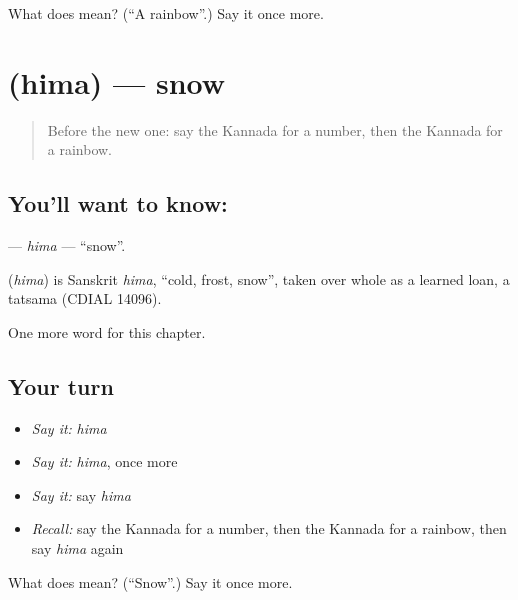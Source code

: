 \begin{tcolorbox}[breakable,colback=teal!4,colframe=teal!35!black,title={Before you move on}]
What does  mean? (\textquotedblleft{}A rainbow\textquotedblright{}.) Say it once more.
\end{tcolorbox}
\section[\texorpdfstring{\kn{ಹಿಮ} (hima)}{ಹಿಮ (hima)}]{ (hima) — snow}

\label{lesson:KA-C187-hima}



\begin{quote}
Before the new one: say the Kannada for a number, then the Kannada for a rainbow.
\end{quote}

\subsection*{You'll want to know: }
\textbf{} — \emph{hima} — \textquotedblleft{}snow\textquotedblright{}.

\begin{cousinweb}
\textbf{} (\emph{hima}) is Sanskrit \emph{hima}, \textquotedblleft{}cold, frost, snow\textquotedblright{}, taken over whole as a learned loan, a tatsama (CDIAL 14096).
\end{cousinweb}

\begin{grammarlens}[title={What you've built}]
One more word for this chapter.
\end{grammarlens}

\subsection*{Your turn}
\begin{itemize}
\raggedright
  \item \emph{Say it:} \emph{hima}
  \item \emph{Say it:} \emph{hima}, once more
  \item \emph{Say it:} say \emph{hima}
  \item \emph{Recall:} say the Kannada for a number, then the Kannada for a rainbow, then say \emph{hima} again
\end{itemize}

\begin{tcolorbox}[breakable,colback=teal!4,colframe=teal!35!black,title={Before you move on}]
What does  mean? (\textquotedblleft{}Snow\textquotedblright{}.) Say it once more.
\end{tcolorbox}

